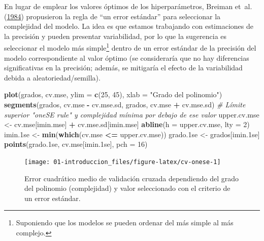 \documentclass[
  spanish,
]{book}
\newenvironment{Shaded}{\begin{snugshade}}{\end{snugshade}}
\newcommand{\CommentTok}[1]{\textcolor[rgb]{0.56,0.35,0.01}{\textit{#1}}}
\newcommand{\DataTypeTok}[1]{\textcolor[rgb]{0.13,0.29,0.53}{#1}}
\newcommand{\DecValTok}[1]{\textcolor[rgb]{0.00,0.00,0.81}{#1}}
\newcommand{\FloatTok}[1]{\textcolor[rgb]{0.00,0.00,0.81}{#1}}
\newcommand{\KeywordTok}[1]{\textcolor[rgb]{0.13,0.29,0.53}{\textbf{#1}}}
\newcommand{\NormalTok}[1]{#1}
\newcommand{\OperatorTok}[1]{\textcolor[rgb]{0.81,0.36,0.00}{\textbf{#1}}}
\newcommand{\StringTok}[1]{\textcolor[rgb]{0.31,0.60,0.02}{#1}}
\theoremstyle{break}
\theoremstyle{definition}
\theoremstyle{definition}
\theoremstyle{definition}
\theoremstyle{remark}
\begin{document}
En lugar de emplear los valores óptimos de los hiperparámetros, Breiman et~al. (\protect\hyperlink{ref-breiman1984classification}{1984}) propusieron la regla de ``un error estándar'' para seleccionar la complejidad del modelo.
La idea es que estamos trabajando con estimaciones de la precisión y pueden presentar variabilidad,
por lo que la sugerencia es seleccionar el modelo más simple\footnote{Suponiendo que los modelos se pueden ordenar del más simple al más complejo.} dentro de un error estándar de la precisión del modelo correspondiente al valor óptimo
(se consideraría que no hay diferencias significativas en la precisión;
además, se mitigaría el efecto de la variabilidad debida a aleatoriedad/semilla).

\begin{Shaded}
\begin{Highlighting}[]
\KeywordTok{plot}\NormalTok{(grados, cv.mse, }\DataTypeTok{ylim =} \KeywordTok{c}\NormalTok{(}\DecValTok{25}\NormalTok{, }\DecValTok{45}\NormalTok{),}
  \DataTypeTok{xlab =} \StringTok{"Grado del polinomio"}\NormalTok{)}
\KeywordTok{segments}\NormalTok{(grados, cv.mse }\OperatorTok{-}\StringTok{ }\NormalTok{cv.mse.sd, grados, cv.mse }\OperatorTok{+}\StringTok{ }\NormalTok{cv.mse.sd)}
\CommentTok{# Límite superior "oneSE rule" y complejidad mínima por debajo de ese valor}
\NormalTok{upper.cv.mse <-}\StringTok{ }\NormalTok{cv.mse[imin.mse] }\OperatorTok{+}\StringTok{ }\NormalTok{cv.mse.sd[imin.mse]}
\KeywordTok{abline}\NormalTok{(}\DataTypeTok{h =}\NormalTok{ upper.cv.mse, }\DataTypeTok{lty =} \DecValTok{2}\NormalTok{)}
\NormalTok{imin}\FloatTok{.1}\NormalTok{se <-}\StringTok{ }\KeywordTok{min}\NormalTok{(}\KeywordTok{which}\NormalTok{(cv.mse }\OperatorTok{<=}\StringTok{ }\NormalTok{upper.cv.mse))}
\NormalTok{grado}\FloatTok{.1}\NormalTok{se <-}\StringTok{ }\NormalTok{grados[imin}\FloatTok{.1}\NormalTok{se]}
\KeywordTok{points}\NormalTok{(grado}\FloatTok{.1}\NormalTok{se, cv.mse[imin}\FloatTok{.1}\NormalTok{se], }\DataTypeTok{pch =} \DecValTok{16}\NormalTok{)}
\end{Highlighting}
\end{Shaded}

\begin{figure}[!htb]

{\centering \texttt{[image: 01-introduccion\_files/figure-latex/cv-onese-1]} 

}

\caption{Error cuadrático medio de validación cruzada dependiendo del grado del polinomio (complejidad) y valor seleccionado con el criterio de un error estándar.}\label{fig:cv-onese}
\end{figure}
\end{document}
